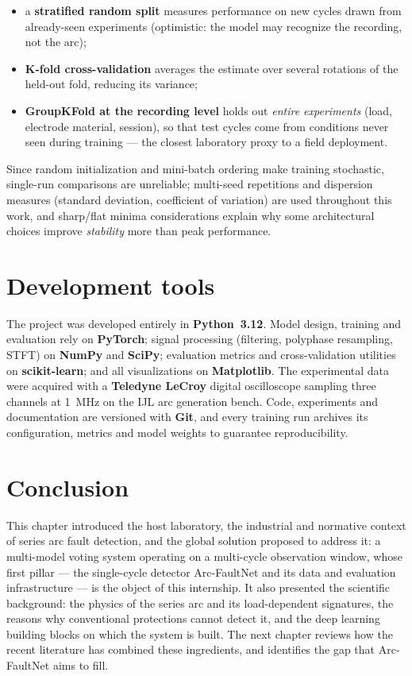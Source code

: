 \begin{itemize}[itemsep=2pt]
    \item a \textbf{stratified random split} measures performance on new cycles drawn from already-seen experiments (optimistic: the model may recognize the recording, not the arc);
    \item \textbf{K-fold cross-validation} averages the estimate over several rotations of the held-out fold, reducing its variance;
    \item \textbf{GroupKFold at the recording level} holds out \emph{entire experiments} (load, electrode material, session), so that test cycles come from conditions never seen during training --- the closest laboratory proxy to a field deployment.
\end{itemize}

Since random initialization and mini-batch ordering make training stochastic, single-run comparisons are unreliable; multi-seed repetitions and dispersion measures (standard deviation, coefficient of variation) are used throughout this work, and sharp/flat minima considerations \cite{keskar2017large} explain why some architectural choices improve \emph{stability} more than peak performance.

\section{Development tools}

The project was developed entirely in \textbf{Python~3.12}. Model design, training and evaluation rely on \textbf{PyTorch}; signal processing (filtering, polyphase resampling, STFT) on \textbf{NumPy} and \textbf{SciPy}; evaluation metrics and cross-validation utilities on \textbf{scikit-learn}; and all visualizations on \textbf{Matplotlib}. The experimental data were acquired with a \textbf{Teledyne LeCroy} digital oscilloscope sampling three channels at 1~MHz on the IJL arc generation bench. Code, experiments and documentation are versioned with \textbf{Git}, and every training run archives its configuration, metrics and model weights to guarantee reproducibility.

\section*{Conclusion}

This chapter introduced the host laboratory, the industrial and normative context of series arc fault detection, and the global solution proposed to address it: a multi-model voting system operating on a multi-cycle observation window, whose first pillar --- the single-cycle detector Arc-FaultNet and its data and evaluation infrastructure --- is the object of this internship. It also presented the scientific background: the physics of the series arc and its load-dependent signatures, the reasons why conventional protections cannot detect it, and the deep learning building blocks on which the system is built. The next chapter reviews how the recent literature has combined these ingredients, and identifies the gap that Arc-FaultNet aims to fill.
